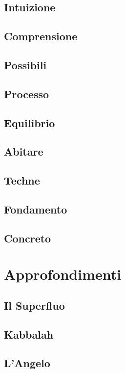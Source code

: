 \documentclass[11pt,a4paper]{book}
\begin{document}
\chapter{Intuizione}


\chapter{Comprensione}


\chapter{Possibili}


\chapter{Processo}


\chapter{Equilibrio}


\chapter{Abitare}


\chapter{Techne}


\chapter{Fondamento}


\chapter{Concreto}


\part{Approfondimenti}

\chapter{Il Superfluo}


\chapter{Kabbalah}


\chapter{L'Angelo}

\end{document}
